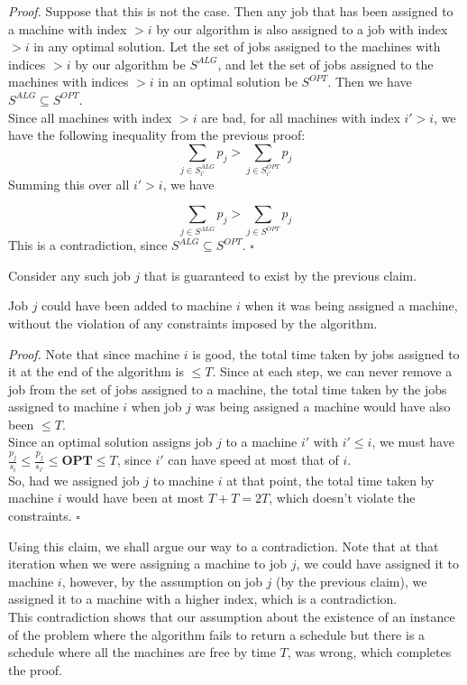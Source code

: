 \documentclass[a4paper]{article}
\newenvironment{proof}{\begin{breakbox}\textit{Proof.}}{\hfill$\square$\end{breakbox}}
\newcommand{\nl}{\vspace{0.2cm}\\}
\newcommand{\OPT}{\mathbf{OPT}}
\begin{document}
\begin{proof}
    Suppose that this is not the case. Then any job that has been assigned to a machine with index $> i$ by our algorithm is also assigned to a job with index $> i$ in any optimal solution. Let
    the set of jobs assigned to the machines with indices $> i$ by our algorithm be $S^{ALG}$, and let the set of jobs assigned to the machines with indices $> i$ in an optimal solution be
    $S^{OPT}$. Then we have $S^{ALG} \subseteq S^{OPT}$.\nl
    Since all machines with index $> i$ are bad, for all machines with index $i' > i$, we have the following inequality from the previous proof:
    $$
    \sum_{j \in S_{i'}^{ALG}} p_j > \sum_{j \in S_{i'}^{OPT}} p_j
    $$
    Summing this over all $i' > i$, we have

    $$
    \sum_{j \in S^{ALG}} p_j > \sum_{j \in S^{OPT}} p_j
    $$
    This is a contradiction, since $S^{ALG} \subseteq S^{OPT}$.
\end{proof}
Consider any such job $j$ that is guaranteed to exist by the previous claim.\nl
\begin{claim}
    Job $j$ could have been added to machine $i$ when it was being assigned a machine, without the violation of any constraints imposed by the algorithm.
\end{claim}
\begin{proof}
    Note that since machine $i$ is good, the total time taken by jobs assigned to it at the end of the algorithm is $\le T$. Since at each step, we can never remove a job from the set of jobs assigned
    to a machine, the total time taken by the jobs assigned to machine $i$ when job $j$ was being assigned a machine would have also been $\le T$.\nl
    Since an optimal solution assigns job $j$ to a machine $i'$ with $i' \le i$, we must have $\frac{p_j}{s_i} \le \frac{p_j}{s_{i'}} \le \OPT \le T$, since $i'$ can have speed at most that of
    $i$.\nl
    So, had we assigned job $j$ to machine $i$ at that point, the total time taken by machine $i$ would have been at most $T + T = 2T$, which doesn't violate the constraints.
\end{proof}

Using this claim, we shall argue our way to a contradiction. Note that at that iteration when we were assigning a machine to job $j$, we could have assigned it to machine $i$, however, by
the assumption on job $j$ (by the previous claim), we assigned it to a machine with a higher index, which is a contradiction.\nl

This contradiction shows that our assumption about the existence of an instance of the problem where the algorithm fails to return a schedule but there is a schedule where all the machines are free
by time $T$, was wrong, which completes the proof.
\end{document}
